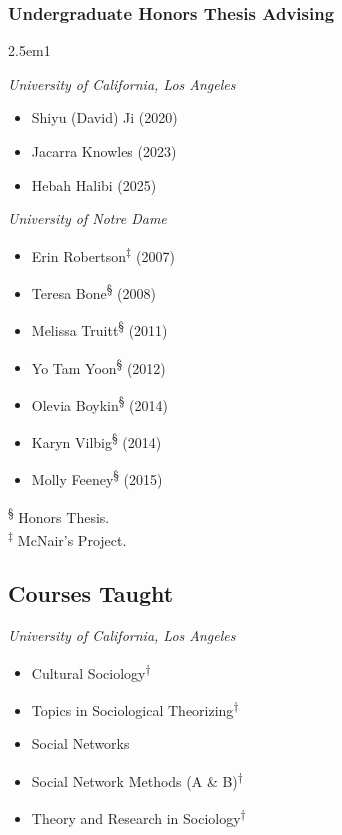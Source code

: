 \documentclass[
]{article}
\providecommand{\tightlist}{%
  \setlength{\itemsep}{0pt}\setlength{\parskip}{0pt}}
\newenvironment{cventry}{\begin{hangparas}{2.5em}{1}}{\end{hangparas}}
\begin{document}
\subsubsection{Undergraduate Honors Thesis
Advising}\label{undergraduate-honors-thesis-advising}

\begin{cventry}

\emph{University of California, Los Angeles}

\begin{itemize}
\tightlist
\item
  Shiyu (David) Ji (2020)
\item
  Jacarra Knowles (2023)
\item
  Hebah Halibi (2025)
\end{itemize}

\emph{University of Notre Dame}

\begin{itemize}
\tightlist
\item
  Erin Robertson\textsuperscript{‡} (2007)
\item
  Teresa Bone\textsuperscript{§} (2008)
\item
  Melissa Truitt\textsuperscript{§} (2011)
\item
  Yo Tam Yoon\textsuperscript{§} (2012)
\item
  Olevia Boykin\textsuperscript{§} (2014)
\item
  Karyn Vilbig\textsuperscript{§} (2014)
\item
  Molly Feeney\textsuperscript{§} (2015)
\end{itemize}

\end{cventry}

\textsuperscript{§} Honors Thesis.\\
\textsuperscript{‡} McNair's Project.

\subsection{Courses Taught}\label{courses-taught}

\emph{University of California, Los Angeles}

\begin{itemize}
\tightlist
\item
  Cultural Sociology\textsuperscript{†}
\item
  Topics in Sociological Theorizing\textsuperscript{†}
\item
  Social Networks
\item
  Social Network Methods (A \& B)\textsuperscript{†}
\item
  Theory and Research in Sociology\textsuperscript{†}
\end{itemize}
\end{document}
